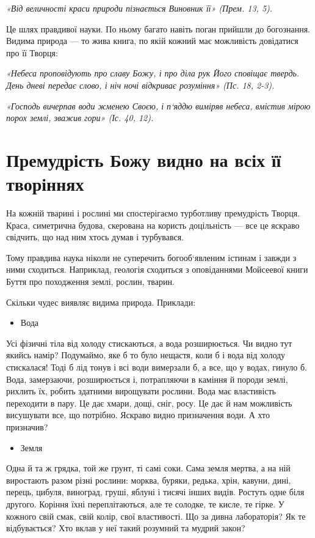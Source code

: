 \documentclass[main.tex]{subfiles}
\begin{document}
\begin{FlushRight}
    \emph{«Від величності краси природи пізнається Виновник її» (Прем. 13, 5).}
\end{FlushRight}

Це шлях правдивої науки. По ньому багато навіть поган прийшли до богознання. Видима природа — то жива книга, по якій кожний має можливість довідатися про її Творця:

\begin{FlushRight}
    \emph{«Небеса проповідують про славу Божу, і про діла рук Його сповіщає твердь. День дневі передає слово, і ніч ночі відкриває розуміння» (Пс. 18, 2-3).}
\end{FlushRight}

\begin{FlushRight}
    \emph{«Господь вичерпав води жменею Своєю, і п`яддю виміряв небеса, вмістив мірою порох землі, зважив гори» (Іс. 40, 12).}
\end{FlushRight}

\section{Премудрість Божу видно на всіх її творіннях}

На кожній тварині і рослині ми спостерігаємо турботливу премудрість Творця. Краса, симетрична будова, скерована на користь доцільність — все це яскраво свідчить, що над ним хтось думав і турбувався.

Тому правдива наука ніколи не суперечить богооб`явленим істинам і завжди з ними сходиться. Наприклад, геологія сходиться з оповіданнями Мойсеевої книги Буття про походження землі, рослин, тварин.

Скільки чудес виявляє видима природа. Приклади:
\begin{itemize}
\item Вода
\end{itemize}
Усі фізичні тіла від холоду стискаються, а вода розширюється. Чи видно тут якийсь намір? Подумаймо, яке б то було нещастя, коли б і вода від холоду стискалася! Тоді б лід тонув і всі води вимерзали б, а все, що у водах, гинуло б. Вода, замерзаючи, розширюється і, потрапляючи в каміння й породи землі, рихлить їх, робить здатними вирощувати рослини. Вода має властивість переходити в пару. Це дає хмари, дощі, сніг, росу. Це дає й нам можливість висушувати все, що потрібно. Яскраво видно призначення води. А хто призначив?
\begin{itemize}
    \item Земля
\end{itemize}
Одна й та ж грядка, той же грунт, ті самі соки. Сама земля мертва, а на ній виростають разом різні рослини: морква, буряки, редька, хрін, кавуни, дині, перець, цибуля, виноград, груші, яблуні і тисячі інших видів. Ростуть одне біля другого. Коріння їхні переплітаються, але те солодке, те кисле, те гірке. У кожного свій смак, свій колір, свої властивості. Що за дивна лабораторія? Як те відбувається? Хто вклав у неї такий розумний та мудрий закон?
\end{document}
